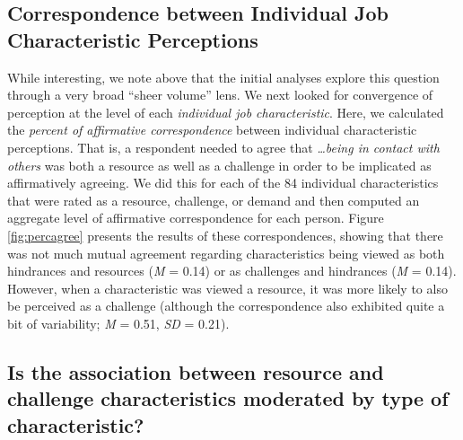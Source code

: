 \documentclass[
  jou]{apa6}
\begin{document}
\hypertarget{correspondence-between-individual-job-characteristic-perceptions}{%
\subsection{Correspondence between Individual Job Characteristic Perceptions}\label{correspondence-between-individual-job-characteristic-perceptions}}

While interesting, we note above that the initial analyses explore this question through a very broad ``sheer volume'' lens. We next looked for convergence of perception at the level of each \emph{individual job characteristic}. Here, we calculated the \emph{percent of affirmative correspondence} between individual characteristic perceptions. That is, a respondent needed to agree that \emph{\ldots being in contact with others} was both a resource as well as a challenge in order to be implicated as affirmatively agreeing. We did this for each of the 84 individual characteristics that were rated as a resource, challenge, or demand and then computed an aggregate level of affirmative correspondence for each person. Figure \ref{fig:percagree} presents the results of these correspondences, showing that there was not much mutual agreement regarding characteristics being viewed as both hindrances and resources (\emph{M} = 0.14) or as challenges and hindrances (\emph{M} = 0.14). However, when a characteristic was viewed a resource, it was more likely to also be perceived as a challenge (although the correspondence also exhibited quite a bit of variability; \emph{M} = 0.51, \emph{SD} = 0.21).

\hypertarget{is-the-association-between-resource-and-challenge-characteristics-moderated-by-type-of-characteristic}{%
\subsection{Is the association between resource and challenge characteristics moderated by type of characteristic?}\label{is-the-association-between-resource-and-challenge-characteristics-moderated-by-type-of-characteristic}}
\end{document}
